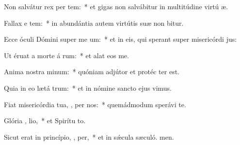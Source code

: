 \item Non salvátur rex per  tem:~* et gigas non salvábitur in multitúdine virtú æ.
\item Fallax e  tem:~* in abundántia autem virtútis suæ non bitur.
\item Ecce óculi Dómini super me um:~* et in eis, qui sperant super misericórdi jus:
\item Ut éruat a morte á rum:~* et alat eos  me.
\item Anima nostra  minum:~* quóniam adjútor et protéc ter est.
\item Quia in eo lætá  trum:~* et in nómine sancto ejus vimus.
\item Fiat misericórdia tua, , per nos:~* quemádmodum sperávi  te.
\item Glória ,  lio,~* et Spirítu to.
\item Sicut erat in princípio,  ,  per,~* et in sǽcula sæculó. men.
